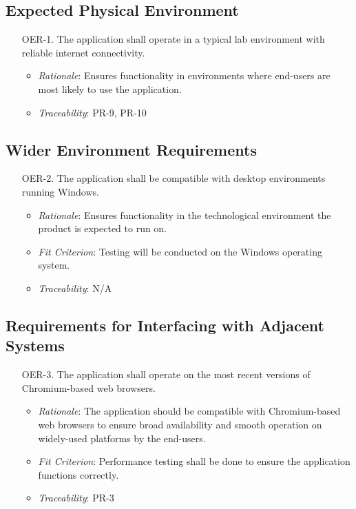 \documentclass[12pt]{article}
\begin{document}
\subsection{Expected Physical Environment}
\begin{enumerate}
  \item[OER-1.] The application shall operate in a typical lab environment with reliable internet connectivity.
    \begin{itemize}
      \item \textit{Rationale}: Ensures functionality in environments where end-users are most likely to use the application. 
      \item \textit{Traceability}: PR-9, PR-10
    \end{itemize}
\end{enumerate}

\subsection{Wider Environment Requirements}
\begin{enumerate}
  \item[OER-2.] The application shall be compatible with desktop environments running Windows.
    \begin{itemize}
      \item \textit{Rationale}: Ensures functionality in the technological environment the product is expected to run on.
      \item \textit{Fit Criterion}: Testing will be conducted on the Windows operating system.
      \item \textit{Traceability}: N/A
    \end{itemize}
\end{enumerate}

\subsection{Requirements for Interfacing with Adjacent Systems}
\begin{enumerate}
  \item[OER-3.] The application shall operate on the most recent versions of Chromium-based web browsers.
    \begin{itemize}
      \item \textit{Rationale}: The application should be compatible with Chromium-based web browsers to ensure broad availability and smooth operation on widely-used platforms by the end-users.
      \item \textit{Fit Criterion}: Performance testing shall be done to ensure the application functions correctly.
      \item \textit{Traceability}: PR-3
    \end{itemize}
\end{enumerate}
\end{document}
